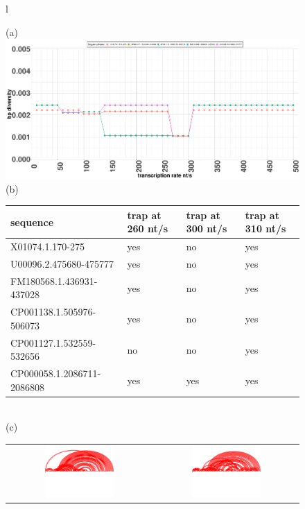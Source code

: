 \documentclass[ twoside,openright,titlepage,numbers=noenddot,headinclude,%
                footinclude=false, cleardoublepage=empty,abstractoff, %
                BCOR=5mm,paper=a4,fontsize=11pt,%
                ngerman,american,%
                ]{scrreprt}
\begin{document}
\begin{figure}
\begin{tabular}{l}

(a) \\
\includegraphics[width=1.0\textwidth]{./pictures/Discussion_results/SRP/SRPseqDecrease250_300nts.pdf}\\

(b) \\
\begin{tabular}{l|l|l|l}
sequence & trap at 260 nt/s  & trap at 300 nt/s & trap at 310 nt/s\\
\hline
X01074.1.170-275			&	yes &	no	&	yes \\
U00096.2.475680-475777		&	yes	&	no	&	yes	\\
FM180568.1.436931-437028	&	yes	&	no	&	yes	\\
CP001138.1.505976-506073	&	yes	&	no	&	yes	\\
CP001127.1.532559-532656 	&	no	&	no	&	yes	\\
CP000058.1.2086711-2086808	&	yes	&	yes	&	yes	\\
\end{tabular}
\\

(c) \\
\begin{tabular}{c|c}
\includegraphics[width=0.5\textwidth]{./pictures/Discussion_results/SRP/X01074_1_170-275_300nts.pdf}&
\includegraphics[width=0.5\textwidth]{./pictures/Discussion_results/SRP/X01074_1_170-275_360nts.pdf}\\
\end{tabular}


\end{tabular}
\end{figure}
\end{document}
